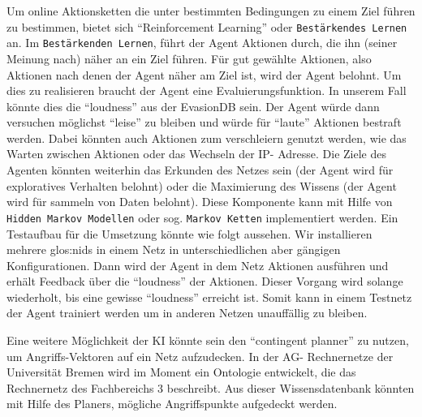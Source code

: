 Um online Aktionsketten die unter bestimmten Bedingungen zu einem Ziel
führen zu bestimmen, bietet sich \enquote{Reinforcement Learning}
\cite{mitchel} oder \verb#Bestärkendes Lernen# an.  Im
\verb#Bestärkenden Lernen#, führt der Agent Aktionen durch, die ihn
(seiner Meinung nach) näher an ein Ziel führen.  Für gut gewählte
Aktionen, also Aktionen nach denen der Agent näher am Ziel ist, wird
der Agent belohnt.  Um dies zu realisieren braucht der Agent eine
Evaluierungsfunktion. In unserem Fall könnte dies die \enquote{loudness} aus
der EvasionDB sein. Der Agent würde dann versuchen möglichst
\enquote{leise} zu bleiben und würde für \enquote{laute} Aktionen bestraft werden.
Dabei könnten auch Aktionen zum verschleiern genutzt werden, wie das
Warten zwischen Aktionen oder das Wechseln der IP- Adresse.  Die Ziele
des Agenten könnten weiterhin das Erkunden des Netzes sein (der Agent
wird für exploratives Verhalten belohnt) oder die Maximierung des
Wissens (der Agent wird für sammeln von Daten belohnt). Diese
Komponente kann mit Hilfe von \verb#Hidden Markov Modellen# oder
sog. \verb#Markov Ketten# implementiert werden.  Ein Testaufbau für
die Umsetzung könnte wie folgt aussehen.  Wir installieren mehrere
\gls{glos:nids} in einem Netz in unterschiedlichen aber gängigen
Konfigurationen. Dann wird der Agent in dem Netz Aktionen ausführen
und erhält Feedback über die \enquote{loudness} der Aktionen.  Dieser
Vorgang wird solange wiederholt, bis eine gewisse \enquote{loudness}
erreicht ist.  Somit kann in einem Testnetz der Agent trainiert werden
um in anderen Netzen unauffällig zu bleiben.

Eine weitere Möglichkeit der KI könnte sein den \enquote{contingent planner}
zu nutzen, um Angriffs-Vektoren auf ein Netz aufzudecken. In der AG-
Rechnernetze der Universität Bremen wird im Moment ein Ontologie
entwickelt, die das Rechnernetz des Fachbereichs 3 beschreibt. Aus
dieser Wissensdatenbank könnten mit Hilfe des Planers, mögliche
Angriffspunkte aufgedeckt werden.

